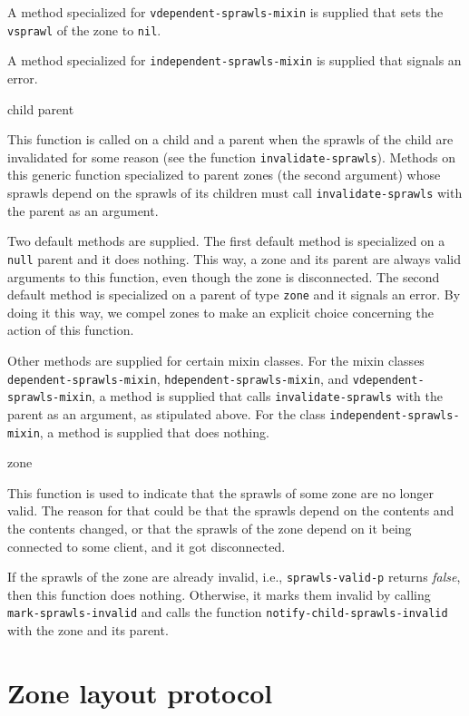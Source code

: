 A method specialized for \texttt{vdependent-sprawls-mixin} is supplied
that sets the \texttt{vsprawl} of the zone to \texttt{nil}.

A method specialized for \texttt{independent-sprawls-mixin} is supplied
that signals an error.

 {child parent}

This function is called on a child and a parent when the sprawls of the
child are invalidated for some reason (see the function
\texttt{invalidate-sprawls}).  Methods on this generic function
specialized to parent zones (the second argument) whose sprawls depend
on the sprawls of its children must call \texttt{invalidate-sprawls} with
the parent as an argument.

Two default methods are supplied.  The first default method is
specialized on a \texttt{null} parent and it does nothing.  This way,
a zone and its parent are always valid arguments to this function,
even though the zone is disconnected.  The second default method is
specialized on a parent of type \texttt{zone} and it signals an error.
By doing it this way, we compel zones to make an explicit choice
concerning the action of this function.

Other methods are supplied for certain mixin classes.  For the mixin
classes \texttt{dependent-sprawls-mixin},
\texttt{hdependent-sprawls-mixin}, and \texttt{vdependent-sprawls-mixin},
a method is supplied that calls \texttt{invalidate-sprawls} with the
parent as an argument, as stipulated above.  For the class
\texttt{independent-sprawls-mixin}, a method is supplied that does
nothing.

 {zone}

This function is used to indicate that the sprawls of some zone are no
longer valid.  The reason for that could be that the sprawls depend on
the contents and the contents changed, or that the sprawls of the zone
depend on it being connected to some client, and it got disconnected.

If the sprawls of the zone are already invalid, i.e.,
\texttt{sprawls-valid-p} returns \emph{false}, then this function does
nothing.  Otherwise, it marks them invalid by calling
\texttt{mark-sprawls-invalid} and calls the function
\texttt{notify-child-sprawls-invalid} with the zone and its parent.

\section{Zone layout protocol}


